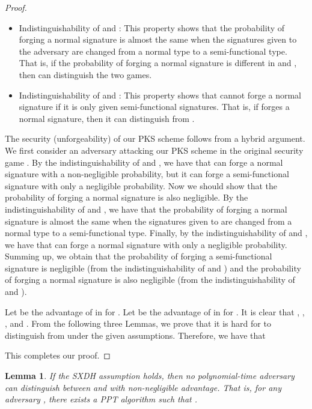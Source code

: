 \documentclass[11pt,letterpaper]{article}
\newtheorem{lemma}[theorem]{Lemma}
\begin{document}
\begin{proof}
\begin{itemize}
\item Indistinguishability of  and : This property
    shows that the probability of  forging a normal signature is
    almost the same when the signatures given to the adversary are changed
    from a normal type to a semi-functional type. That is, if the
    probability of  forging a normal signature is different in
     and , then  can distinguish the two games.

\item Indistinguishability of  and : This property
    shows that  cannot forge a normal signature if it is only given
    semi-functional signatures. That is, if  forges a normal
    signature, then it can distinguish  from .
\end{itemize}

The security (unforgeability) of our PKS scheme follows from a hybrid
argument. We first consider an adversary  attacking our PKS scheme in
the original security game . By the indistinguishability of
 and , we have that  can forge a normal signature
with a non-negligible  probability, but it can forge a
semi-functional signature with only a negligible probability. Now we should
show that the  probability of  forging a normal signature
is also negligible. By the indistinguishability of  and ,
we have that the  probability of  forging a normal
signature is almost the same when the signatures given to  are
changed from a normal type to a semi-functional type. Finally, by the
indistinguishability of  and , we have that  can
forge a normal signature with only a negligible probability. Summing up, we
obtain that the probability of  forging a semi-functional signature
is negligible (from the indistinguishability of  and )
and the probability of  forging a normal signature is also negligible
(from the indistinguishability of  and ).

Let  be the advantage of  in  for
. Let  be the advantage of 
in  for . It is clear that
    ,
    ,
    , and
    .
From the following three Lemmas, we prove that it is hard for  to
distinguish  from  under the given assumptions.
Therefore, we have that
    
This completes our proof.
\end{proof}

\begin{lemma} \label{lem:pks1-prime-1}
If the SXDH assumption holds, then no polynomial-time adversary can
distinguish between  and  with non-negligible advantage.
That is, for any adversary , there exists a PPT algorithm 
such that
    .
\end{lemma}
\end{document}

